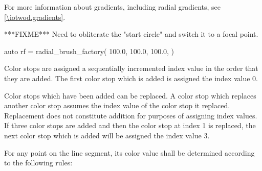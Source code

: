 \pnum
For more information about gradients, including radial gradients, see \ref{\iotwod.gradients}.


***FIXME*** Need to obliterate the "start circle" and switch it to a focal point.
\pnum
\enterexample
\begin{codeblock}
auto rf = radial_brush_factory({ 100.0, 100.0}, 100.0, )
\end{codeblock}
\exitexample

\pnum
Color stops are assigned a sequentially incremented  index value in the order that they are added. The first color stop which is added is assigned the index value 0.

\pnum
Color stops which have been added can be replaced. A color stop which replaces another color stop assumes the index value of the color stop it replaced. Replacement does not constitute addition for purposes of assigning index values.
\enterexample
If three color stops are added and then the color stop at index 1 is replaced, the next color stop which is added will be assigned the index value 3.
\exitexample

\pnum
For any point on the line segment, its color value shall be determined according to the following rules:

